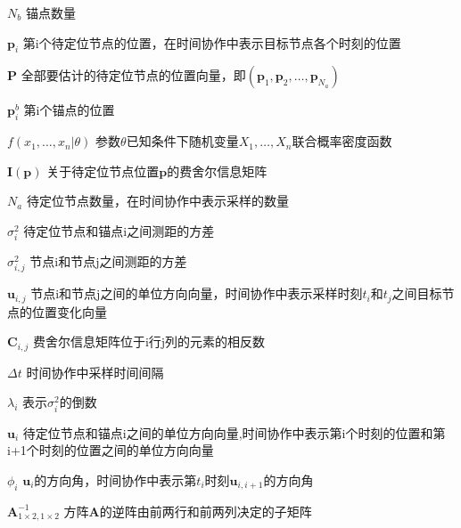 \begin{denotation}[3cm]
\item[$N_b$] 锚点数量
\item[$\bm{p}_i$] 第i个待定位节点的位置，在时间协作中表示目标节点各个时刻的位置
\item[$\bm{P}$] 全部要估计的待定位节点的位置向量，即$(\bm{p}_1,\bm{p}_2,\dots,\bm{p}_{N_a})$
\item[$\bm{p}^b_i$] 第i个锚点的位置
\item[$f(x_1,\dots,x_n|\theta)$] 参数$\theta$已知条件下随机变量$X_1,\dots,X_n$联合概率密度函数
\item[$\bm{I}(\bm{p})$] 关于待定位节点位置$\bm{p}$的费舍尔信息矩阵
\item[$N_a$] 待定位节点数量，在时间协作中表示采样的数量
\item[$\sigma^2_{i}$] 待定位节点和锚点i之间测距的方差
\item[$\sigma^2_{i,j}$] 节点i和节点j之间测距的方差
\item[$\bm{u}_{i,j}$] 节点i和节点j之间的单位方向向量，时间协作中表示采样时刻$t_i$和$t_j$之间目标节点的位置变化向量
\item[$\bm{C}_{i,j}$] 费舍尔信息矩阵位于i行j列的元素的相反数
\item[$\Delta t$] 时间协作中采样时间间隔
\item[$\lambda_{i}$] 表示$\sigma^2_{i}$的倒数
\item[$\bm{u}_i$] 待定位节点和锚点i之间的单位方向向量,时间协作中表示第i个时刻的位置和第i+1个时刻的位置之间的单位方向向量
\item[$\phi_i$] $\bm{u}_i$的方向角，时间协作中表示第$t_i$时刻$\bm{u}_{i,i+1}$的方向角
\item[$\bm{A}^{-1}_{1\times2,1\times2}$] 方阵$\bm{A}$的逆阵由前两行和前两列决定的子矩阵
\end{denotation}
